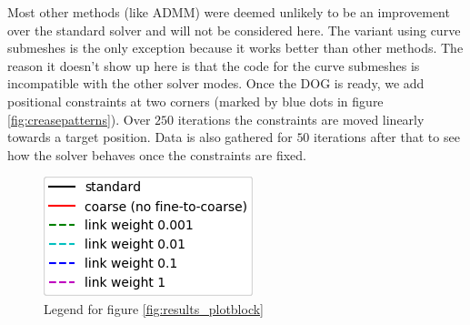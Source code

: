 \documentclass[a4paper,twoside,12pt,nochapterprefix]{scrbook}
\begin{document}
Most other methods (like ADMM) were deemed unlikely to be an improvement over the standard solver and will not be considered here. The variant using curve submeshes is the only exception because it works better than other methods. The reason it doesn't show up here is that the code for the curve submeshes is incompatible with the other solver modes.\newline
Once the DOG is ready, we add positional constraints at two corners (marked by blue dots in figure \ref{fig:creasepatterns}). Over $250$ iterations the constraints are moved linearly towards a target position. Data is also gathered for $50$ iterations after that to see how the solver behaves once the constraints are fixed.\newline
\begin{figure}
    \centering
    \includegraphics{figures/0302_legend}
    \caption{Legend for figure \ref{fig:results_plotblock}}
    \label{fig:results_legend}
\end{figure}
\end{document}
